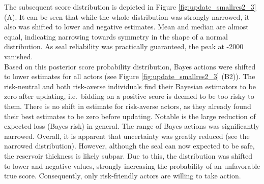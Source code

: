 				The subsequent score distribution is depicted in Figure \ref{fig:update_smallres2_3} (A). It can be seen that while the whole distribution was strongly narrowed, it also was shifted to lower and negative estimates. Mean and median are almost equal, indicating narrowing towards symmetry in the shape of a normal distribution. As seal reliability was practically guaranteed, the peak at -2000 vanished.\\				
				Based on this posterior score probability distribution, Bayes actions were shifted to lower estimates for all actors (see Figure \ref{fig:update_smallres2_3} (B2)). The risk-neutral and both risk-averse individuals find their Bayesian estimators to be zero after updating, i.e.\ bidding on a positive score is deemed to be too risky to them. There is no shift in estimate for risk-averse actors, as they already found their best estimates to be zero before updating. Notable is the large reduction of expected loss (Bayes risk) in general. The range of Bayes actions was significantly narrowed. Overall, it is apparent that uncertainty was greatly reduced (see the narrowed distribution). However, although the seal can now expected to be safe, the reservoir thickness is likely subpar. Due to this, the distribution was shifted to lower and negative values, strongly increasing the probability of an unfavorable true score. Consequently, only risk-friendly actors are willing to take action.
